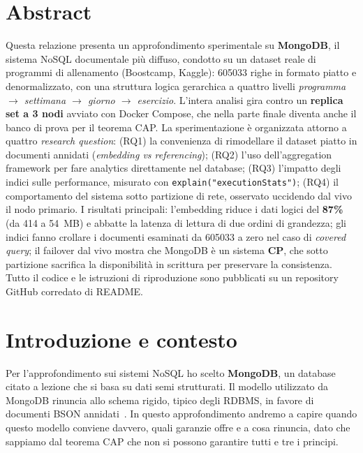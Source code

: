 \documentclass{article}
\begin{document}


\tableofcontents
\newpage

\section*{Abstract}
Questa relazione presenta un approfondimento sperimentale su \textbf{MongoDB}, il
sistema NoSQL documentale più diffuso, condotto su un dataset reale di programmi
di allenamento (Boostcamp, Kaggle): \num{605033} righe in formato piatto e
denormalizzato, con una struttura logica gerarchica a quattro livelli
\emph{programma $\rightarrow$ settimana $\rightarrow$ giorno $\rightarrow$ esercizio}.
L'intera analisi gira contro un \textbf{replica set a 3 nodi} avviato con Docker
Compose, che nella parte finale diventa anche il banco di prova per il teorema CAP.
La sperimentazione è organizzata attorno a quattro \emph{research question}:
(RQ1) la convenienza di rimodellare il dataset piatto in documenti annidati
(\emph{embedding vs referencing}); (RQ2) l'uso dell'aggregation framework per fare
analytics direttamente nel database; (RQ3) l'impatto degli indici sulle
performance, misurato con \texttt{explain("executionStats")}; (RQ4) il
comportamento del sistema sotto partizione di rete, osservato uccidendo dal vivo
il nodo primario. I risultati principali: l'embedding riduce i dati logici del
\textbf{87\%} (da 414 a 54~MB) e abbatte la latenza di lettura di due ordini di
grandezza; gli indici fanno crollare i documenti esaminati da \num{605033} a zero
nel caso di \emph{covered query}; il failover dal vivo mostra che MongoDB è un
sistema \textbf{CP}, che sotto partizione sacrifica la disponibilità in scrittura
per preservare la consistenza. Tutto il codice e le istruzioni di riproduzione
sono pubblicati su un repository GitHub corredato di README.

\section{Introduzione e contesto}
\label{sec:intro}

Per l'approfondimento sui sistemi NoSQL ho scelto \textbf{MongoDB}, un database
citato a lezione che si basa su dati semi strutturati. Il modello utilizzato da
MongoDB rinuncia allo schema rigido, tipico degli RDBMS, in favore di documenti
BSON annidati~\cite{MongoDBDefinitiveGuide}. In questo approfondimento andremo a
capire quando questo modello conviene davvero, quali garanzie offre e a cosa
rinuncia, dato che sappiamo dal teorema CAP che non si possono garantire tutti e
tre i principi.
\end{document}
